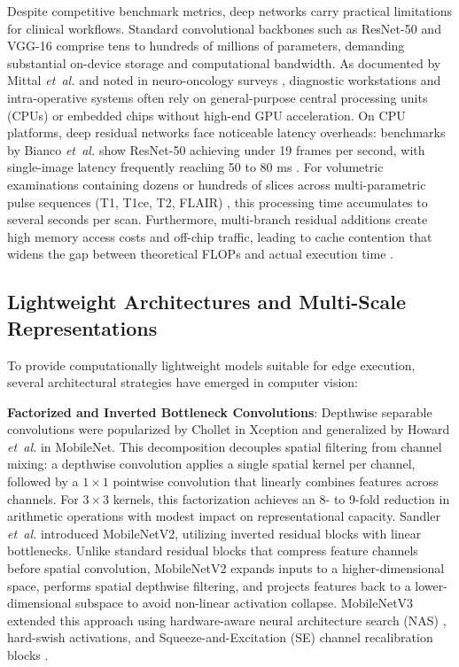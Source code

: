 \documentclass[journal]{IEEEtran}
\begin{document}
Despite competitive benchmark metrics, deep networks carry practical limitations for clinical workflows. Standard convolutional backbones such as ResNet-50 \cite{10} and VGG-16 \cite{29} comprise tens to hundreds of millions of parameters, demanding substantial on-device storage and computational bandwidth. As documented by Mittal \emph{et~al.} \cite{25} and noted in neuro-oncology surveys \cite{40}, diagnostic workstations and intra-operative systems often rely on general-purpose central processing units (CPUs) or embedded chips without high-end GPU acceleration. On CPU platforms, deep residual networks face noticeable latency overheads: benchmarks by Bianco \emph{et~al.} \cite{43} show ResNet-50 achieving under 19 frames per second, with single-image latency frequently reaching 50 to 80 ms \cite{25, 44}. For volumetric examinations containing dozens or hundreds of slices across multi-parametric pulse sequences (T1, T1ce, T2, FLAIR) \cite{2, 23, 45}, this processing time accumulates to several seconds per scan. Furthermore, multi-branch residual additions create high memory access costs and off-chip traffic, leading to cache contention that widens the gap between theoretical FLOPs and actual execution time \cite{25}.

\subsection{Lightweight Architectures and Multi-Scale Representations}
To provide computationally lightweight models suitable for edge execution, several architectural strategies have emerged in computer vision:

\noindent\textbf{Factorized and Inverted Bottleneck Convolutions}: Depthwise separable convolutions were popularized by Chollet \cite{13} in Xception and generalized by Howard \emph{et~al.} \cite{11} in MobileNet. This decomposition decouples spatial filtering from channel mixing: a depthwise convolution applies a single spatial kernel per channel, followed by a $1\times1$ pointwise convolution that linearly combines features across channels. For $3\times3$ kernels, this factorization achieves an 8- to 9-fold reduction in arithmetic operations with modest impact on representational capacity. Sandler \emph{et~al.} \cite{27} introduced MobileNetV2, utilizing inverted residual blocks with linear bottlenecks. Unlike standard residual blocks that compress feature channels before spatial convolution, MobileNetV2 expands inputs to a higher-dimensional space, performs spatial depthwise filtering, and projects features back to a lower-dimensional subspace to avoid non-linear activation collapse. MobileNetV3 \cite{14} extended this approach using hardware-aware neural architecture search (NAS) \cite{36}, hard-swish activations, and Squeeze-and-Excitation (SE) channel recalibration blocks \cite{12}.
\end{document}
